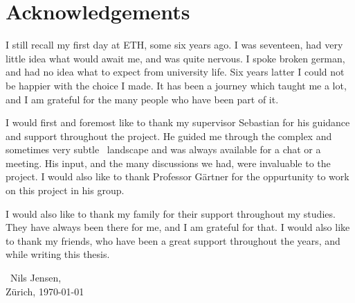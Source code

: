 \chapter*{Acknowledgements}

I still recall my first day at ETH, some six years ago. I was seventeen, had very little idea what would await me, and was quite nervous. I spoke broken german, and had no idea what to expect from university life. Six years latter I could not be happier with the choice I made. It has been a journey which taught me a lot, and I am grateful for the many people who have been part of it.

I would first and foremost like to thank my supervisor Sebastian for his guidance and support throughout the project. He guided me through the complex and sometimes very subtle \TFNP\ landscape and was always available for a chat or a meeting. His input, and the many discussions we had, were invaluable to the project. I would also like to thank Professor Gärtner for the oppurtunity to work on this project in his group.

I would also like to thank my family for their support throughout my studies. They have always been there for me, and I am grateful for that. I would also like to thank my friends, who have been a great support throughout the years, and while writing this thesis.

	{\raggedleft\ Nils Jensen,\\ Zürich, \today\par}
